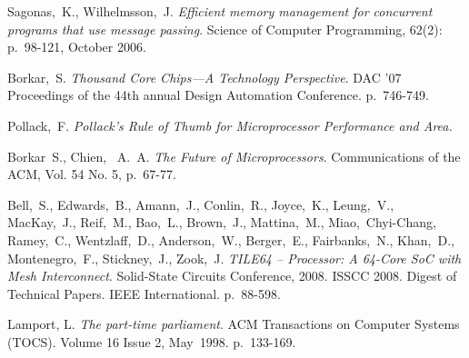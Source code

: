 \documentclass[english,11pt]{article}
\begin{document}
\clearpage
\begin{thebibliography}{9}

     Sagonas,~K., Wilhelmsson,~J. \emph{Efficient memory
        management for concurrent programs that use message passing}. Science of
        Computer Programming, 62(2): p.~98-121, October 2006.

     Borkar,~S. \emph{Thousand Core Chips—A Technology
        Perspective}. DAC '07 Proceedings of the 44th annual Design Automation
        Conference. p.~746-749.

     Pollack,~F. \emph{Pollack's Rule of Thumb for
        Microprocessor Performance and Area.}

     Borkar~S., Chien,~ A.~A. \emph{The Future
        of Microprocessors}. Communications of the ACM, Vol. 54 No. 5, p.~67-77.

     Bell,~S., Edwards,~B., Amann,~J., Conlin,~R.,
        Joyce,~K., Leung,~V., MacKay,~J., Reif,~M., Bao,~L., Brown,~J.,
        Mattina,~M., Miao,~Chyi-Chang, Ramey,~C., Wentzlaff,~D.,
        Anderson,~W., Berger,~E., Fairbanks,~N., Khan,~D., Montenegro,~F.,
        Stickney,~J., Zook,~J. \emph{TILE64 -- Processor: A 64-Core SoC with
        Mesh Interconnect}. Solid-State Circuits Conference, 2008. ISSCC 2008.
        Digest of Technical Papers. IEEE International. p.~88-598.

     Lamport, L. \emph{The part-time parliament}. ACM
        Transactions on Computer Systems (TOCS). Volume 16 Issue 2, May~1998.
        p.~133-169.


\end{thebibliography}
\end{document}
